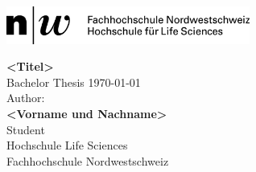 \documentclass[11pt]{article}
\begin{document}
    
    \begin{titlepage}
        \includegraphics[width=0.6\textwidth]{images/fhnw.png}
        \vspace{4cm}
        
        \vspace{1cm}
        
        {\Huge \textbf{<Titel>}}\\
        Bachelor Thesis
        {\today}\\
        
        \vfill
        Author:\\
        \textbf{<Vorname und Nachname>}\\
        Student\\
        Hochschule Life Sciences\\
        Fachhochschule Nordwestschweiz\\
        
    \end{titlepage}
    \pagebreak
    
\end{document}
